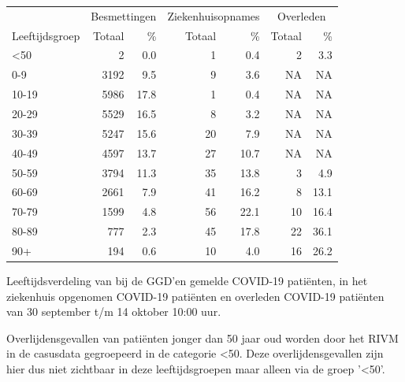 \documentclass[
  english,
  man,floatsintext]{apa6}
\begin{document}
\begin{table}
\centering\begingroup\fontsize{11}{13}\selectfont

\begin{threeparttable}
\begin{tabular}{lrrrrrr}
\toprule
\multicolumn{1}{c}{ } & \multicolumn{2}{c}{Besmettingen} & \multicolumn{2}{c}{Ziekenhuisopnames} & \multicolumn{2}{c}{Overleden} \\
\cmidrule(l{3pt}r{3pt}){2-3} \cmidrule(l{3pt}r{3pt}){4-5} \cmidrule(l{3pt}r{3pt}){6-7}
Leeftijdsgroep & Totaal & \% & Totaal & \% & Totaal & \%\\
\midrule
<50 & 2 & 0.0 & 1 & 0.4 & 2 & 3.3\\
0-9 & 3192 & 9.5 & 9 & 3.6 & NA & NA\\
10-19 & 5986 & 17.8 & 1 & 0.4 & NA & NA\\
20-29 & 5529 & 16.5 & 8 & 3.2 & NA & NA\\
30-39 & 5247 & 15.6 & 20 & 7.9 & NA & NA\\
40-49 & 4597 & 13.7 & 27 & 10.7 & NA & NA\\
50-59 & 3794 & 11.3 & 35 & 13.8 & 3 & 4.9\\
60-69 & 2661 & 7.9 & 41 & 16.2 & 8 & 13.1\\
70-79 & 1599 & 4.8 & 56 & 22.1 & 10 & 16.4\\
80-89 & 777 & 2.3 & 45 & 17.8 & 22 & 36.1\\
90+ & 194 & 0.6 & 10 & 4.0 & 16 & 26.2\\
\bottomrule
\end{tabular}
\begin{tablenotes}
\item[1] Leeftijdsverdeling van bij de GGD’en gemelde COVID-19 patiënten, in het ziekenhuis opgenomen COVID-19 patiënten en overleden COVID-19 patiënten van 30 september t/m 14 oktober 10:00 uur.
\item[2] Overlijdensgevallen van patiënten jonger dan 50 jaar oud worden door het RIVM in de casusdata gegroepeerd in de categorie <50. Deze overlijdensgevallen zijn hier dus niet zichtbaar in deze leeftijdsgroepen maar alleen via de groep '<50'.
\end{tablenotes}
\end{threeparttable}
\endgroup{}
\end{table}

\newpage
\end{document}
